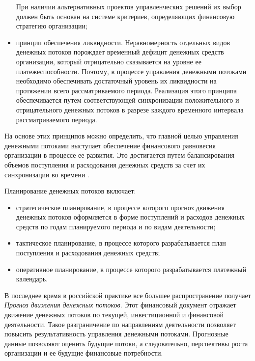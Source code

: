 \begin{itemize}
	При наличии альтернативных проектов управленческих решений их выбор должен быть основан на системе критериев, определяющих финансовую стратегию организации;
	\item принцип обеспечения ликвидности.
	Неравномерность отдельных видов денежных потоков порождает временный дефицит денежных средств организации, который отрицательно сказывается на уровне ее платежеспособности.
	Поэтому, в процессе управления денежными потоками необходимо обеспечивать достаточный уровень их ликвидности на протяжении всего рассматриваемого периода.
	Реализация этого принципа обеспечивается путем соответствующей синхронизации положительного и отрицательного денежных потоков в разрезе каждого временного интервала рассматриваемого периода.
\end{itemize}

На основе этих принципов можно определить, что главной целью управления денежными потоками выступает обеспечение финансового равновесия организации в процессе ее развития.
Это достигается путем балансирования объемов поступления и расходования денежных средств за счет их синхронизации во времени \cite[137--140]{kirichenko}.

Планирование денежных потоков включает:
\begin{itemize}
	\item стратегическое планирование, в процессе которого прогноз движения денежных потоков оформляется в форме поступлений и расходов денежных средств по годам планируемого периода и по видам деятельности;
	\item тактическое планирование, в процессе которого разрабатывается план поступления и расходования денежных средств;
	\item оперативное планирование, в процессе которого разрабатывается платежный календарь.
\end{itemize}

В последнее время в российской практике все большее распространение получает \textit{Прогноз движения денежных потоков}.
Этот финансовый документ отражает движение денежных потоков по текущей, инвестиционной и финансовой деятельности.
Такое разграничение по направлениям деятельности позволяет повысить результативность управления денежными потоками.
Прогнозные данные позволяют оценить будущие потоки, а следовательно, перспективы роста организации и ее будущие финансовые потребности.